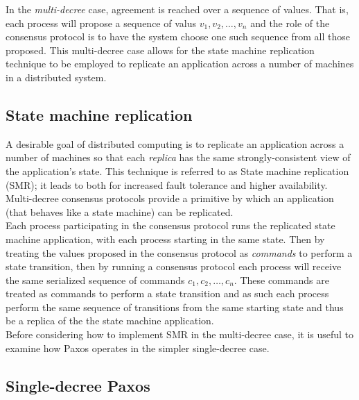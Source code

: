 In the \emph{multi-decree} case, agreement is reached over a sequence of values. That is, each process will propose a sequence of valus $v_1, v_2, \ldots, v_n$ and the role of the consensus protocol is to have the system choose one such sequence from all those proposed. This multi-decree case allows for the state machine replication technique to be employed to replicate an application across a number of machines in a distributed system.




\subsection{State machine replication}


A desirable goal of distributed computing is to replicate an application across a number of machines so that each \emph{replica} has the same strongly-consistent view of the application's state. This technique is referred to as State machine replication (SMR); it leads to both for increased fault tolerance and higher availability. Multi-decree consensus protocols provide a primitive by which an application (that behaves like a state machine) can be replicated. \\

Each process participating in the consensus protocol runs the replicated state machine application, with each process starting in the same state. Then by treating the values proposed in the consensus protocol as \emph{commands} to perform a state transition, then by running a consensus protocol each process will receive the same serialized sequence of commands $c_1, c_2, \ldots, c_n$. These commands are treated as commands to perform a state transition and as such each process perform the same sequence of transitions from the same starting state and thus be a replica of the the state machine application. \\

Before considering how to implement SMR in the multi-decree case, it is useful to examine how Paxos operates in the simpler single-decree case. 



\subsection{Single-decree Paxos}

